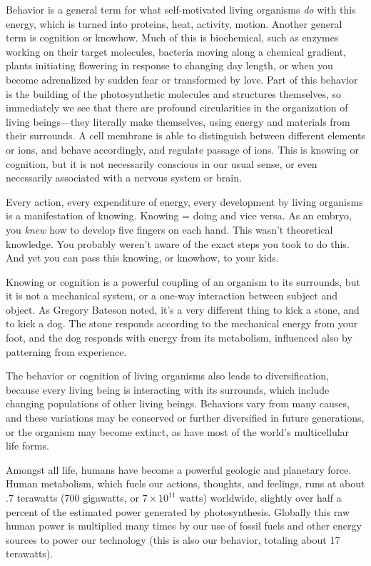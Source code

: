 \documentclass[11pt,letterpaper,twoside,onecolumn]{memoir}
\begin{document}
Behavior is a general term for what self-motivated living organisms \textit{do} with this energy, which is turned into proteins, heat, activity, motion. Another general term is cognition or knowhow.\label{knowhow} Much of this is biochemical, such as enzymes working on their target molecules, bacteria moving along a chemical gradient, plants initiating flowering in response to changing day length, or when you become adrenalized by sudden fear or transformed by love. Part of this behavior is the building of the photosynthetic molecules and structures themselves, so immediately we see that there are profound circularities in the organization of living beings---they literally make themselves, using energy and materials from their surrounds. A cell membrane is able to distinguish between different elements or ions, and behave accordingly, and regulate passage of ions. This is knowing or cognition, but it is not necessarily conscious in our usual sense, or even necessarily associated with a nervous system or brain.

Every action, every expenditure of energy, every development by living organisms is a manifestation of knowing. Knowing = doing and vice versa. As an embryo, you \textit{knew} how to develop five fingers on each hand. This wasn't theoretical knowledge. You probably weren't aware of the exact steps you took to do this. And yet you can pass this knowing, or knowhow, to your kids.

Knowing or cognition is a powerful coupling of an organism to its surrounds, but it is not a mechanical system, or a one-way interaction between subject and object. As Gregory Bateson noted, it's a very different thing to kick a stone, and to kick a dog. The stone responds according to the mechanical energy from your foot, and the dog responds with energy from its metabolism, influenced also by patterning from experience.

The behavior or cognition of living organisms also leads to diversification, because every living being is interacting with its surrounds, which include changing populations of other living beings. Behaviors vary from many causes, and these variations may be conserved or further diversified in future generations, or the organism may become extinct, as have most of the world's multicellular life forms.

Amongst all life, humans have become a powerful geologic and planetary force. Human metabolism, which fuels our actions, thoughts, and feelings, runs at about .7 terawatts (700 gigawatts, or $7 \times  10^{11}$ watts) worldwide, slightly over half a percent of the estimated power generated by photosynthesis. Globally this raw human power is multiplied many times by our use of fossil fuels and other energy sources to power our technology (this is also our behavior, totaling about 17 terawatts).
\end{document}
